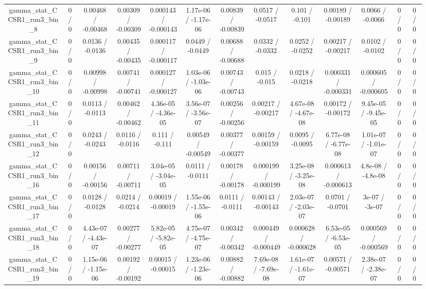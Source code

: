 \documentclass[10pt]{article}
\begin{document}
\begin{table}[htbp]
\begin{center}
\begin{tabular}{|c|c|c|c|c|c|c|c|c|c|c|c|c|}
  gamma_stat_CCSR1_run3_bin_8 & 0 / 0 & 0.00468 / -0.00468 & 0.00309 / -0.00309 & 0.000143 / -0.000143 & 1.17e-06 / -1.17e-06 & 0.00839 / -0.00839 & 0.0517 / -0.0517 & 0.101 / -0.101 & 0.00189 / -0.00189 & 0.0066 / -0.0066 & 0 / 0 & 0 / 0 \\ 
  gamma_stat_CCSR1_run3_bin_9 & 0 / 0 & 0.0136 / -0.0136 & 0.00435 / -0.00435 & 0.000117 / -0.000117 & 0.0449 / -0.0449 & 0.00688 / -0.00688 & 0.0332 / -0.0332 & 0.0252 / -0.0252 & 0.00217 / -0.00217 & 0.0102 / -0.0102 & 0 / 0 & 0 / 0 \\ 
  gamma_stat_CCSR1_run3_bin_10 & 0 / 0 & 0.00998 / -0.00998 & 0.00741 / -0.00741 & 0.000127 / -0.000127 & 1.03e-06 / -1.03e-06 & 0.00743 / -0.00743 & 0.015 / -0.015 & 0.0218 / -0.0218 & 0.000331 / -0.000331 & 0.000605 / -0.000605 & 0 / 0 & 0 / 0 \\ 
  gamma_stat_CCSR1_run3_bin_11 & 0 / 0 & 0.0113 / -0.0113 & 0.00462 / -0.00462 & 4.36e-05 / -4.36e-05 & 3.56e-07 / -3.56e-07 & 0.00256 / -0.00256 & 0.00217 / -0.00217 & 4.67e-08 / -4.67e-08 & 0.00172 / -0.00172 & 9.45e-05 / -9.45e-05 & 0 / 0 & 0 / 0 \\ 
  gamma_stat_CCSR1_run3_bin_12 & 0 / 0 & 0.0243 / -0.0243 & 0.0116 / -0.0116 & 0.111 / -0.111 & 0.00549 / -0.00549 & 0.00377 / -0.00377 & 0.00159 / -0.00159 & 0.0095 / -0.0095 & 6.77e-08 / -6.77e-08 & 1.01e-07 / -1.01e-07 & 0 / 0 & 0 / 0 \\ 
  gamma_stat_CCSR1_run3_bin_16 & 0 / 0 & 0.00156 / -0.00156 & 0.00711 / -0.00711 & 3.04e-05 / -3.04e-05 & 0.0111 / -0.0111 & 0.00178 / -0.00178 & 0.000199 / -0.000199 & 3.25e-08 / -3.25e-08 & 0.000613 / -0.000613 & 4.8e-08 / -4.8e-08 & 0 / 0 & 0 / 0 \\ 
  gamma_stat_CCSR1_run3_bin_17 & 0 / 0 & 0.0128 / -0.0128 & 0.0214 / -0.0214 & 0.00019 / -0.00019 & 1.55e-06 / -1.55e-06 & 0.0111 / -0.0111 & 0.00143 / -0.00143 & 2.03e-07 / -2.03e-07 & 0.0701 / -0.0701 & 3e-07 / -3e-07 & 0 / 0 & 0 / 0 \\ 
  gamma_stat_CCSR1_run3_bin_18 & 0 / 0 & 4.43e-07 / -4.43e-07 & 0.00277 / -0.00277 & 5.82e-05 / -5.82e-05 & 4.75e-07 / -4.75e-07 & 0.00342 / -0.00342 & 0.000449 / -0.000449 & 0.000628 / -0.000628 & 6.53e-05 / -6.53e-05 & 0.000569 / -0.000569 & 0 / 0 & 0 / 0 \\ 
  gamma_stat_CCSR1_run3_bin_19 & 0 / 0 & 1.15e-06 / -1.15e-06 & 0.00192 / -0.00192 & 0.00015 / -0.00015 & 1.23e-06 / -1.23e-06 & 0.00882 / -0.00882 & 7.69e-08 / -7.69e-08 & 1.61e-07 / -1.61e-07 & 0.00571 / -0.00571 & 2.38e-07 / -2.38e-07 & 0 / 0 & 0 / 0 \\ 

\end{tabular}
\end{center}
\end{table}
\end{document}
